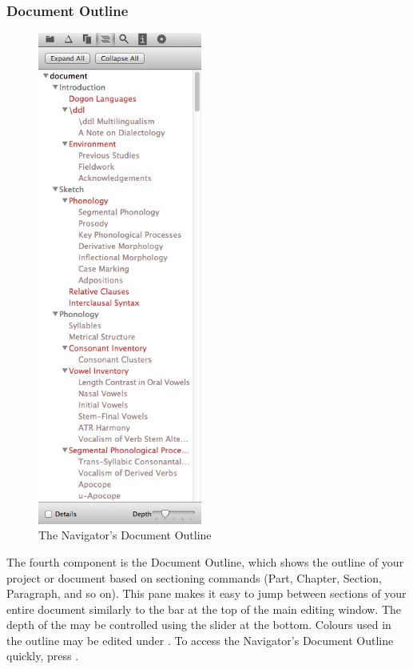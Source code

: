 \subsubsection{Document Outline}
\begin{figure}
\includegraphics[width=0.48\textwidth, trim = 0 8.75in 0 0, clip = true]{TeXnicle-Images/texnicle-nav-docoutline.png}
\caption{The Navigator's Document Outline}
\label{fig:texnicle-nav-docoutline}
\end{figure}
The fourth component is the Document Outline, which shows the outline of your project or document based on sectioning commands (Part, Chapter, Section, Paragraph, and so on). This pane makes it easy to jump between sections of your entire document similarly to the  bar at the top of the main editing window. The depth of the may be controlled using the slider at the bottom. Colours used in the outline may be edited under . To access the Navigator's Document Outline quickly, press .

